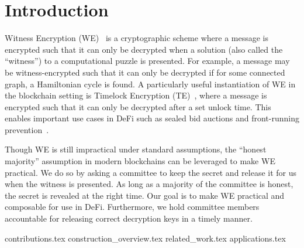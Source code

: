 \section{Introduction}


Witness Encryption (WE)~\cite{witness_encryption} is a cryptographic scheme where a message is encrypted such that it can only be decrypted when a solution (also called the ``witness'') to a computational puzzle is presented.
For example, a message may be witness-encrypted such that it can only be decrypted if for some connected graph, a Hamiltonian cycle is found.
A particularly useful instantiation of WE in the blockchain setting is Timelock Encryption (TE)~\cite{timelock_puzzles,timelock_from_crc,timed_release_cryptography}, where a message is encrypted such that it can only be decrypted after a set unlock time.
This enables important use cases in DeFi such as sealed bid auctions and front-running prevention~\cite{i-TiRE}.

Though WE is still impractical under standard assumptions, the ``honest majority'' assumption in modern blockchains can be leveraged to make WE practical.
We do so by asking a committee to keep the secret and release it for us when the witness is presented.
As long as a majority of the committee is honest, the secret is revealed at the right time.
Our goal is to make WE practical and composable for use in DeFi.
Furthermore, we hold committee members accountable for releasing correct decryption keys in a timely manner.

{contributions.tex}
{construction_overview.tex}
{related_work.tex}
{applications.tex}
